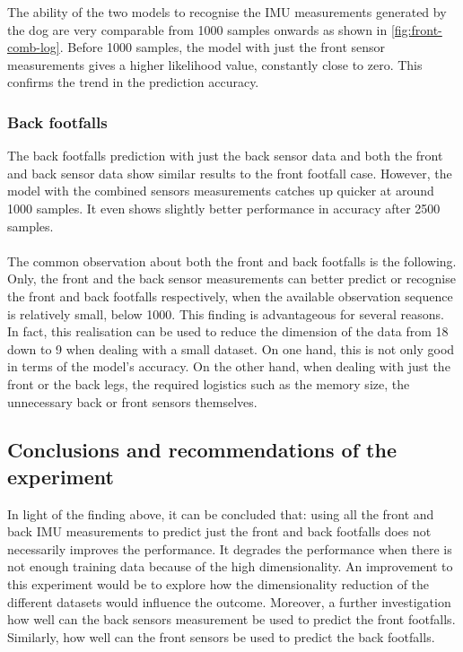 The ability of the two models to recognise the IMU measurements generated by the dog are very comparable from 1000 samples onwards as shown in \ref{fig:front-comb-log}. Before 1000 samples, the model with just the front sensor measurements gives a higher likelihood value, constantly close to zero. This confirms the trend in the prediction accuracy.

\subsubsection{Back footfalls}

The back footfalls prediction with just the back sensor data and both the front and back sensor data show similar results to the front footfall case. However, the model with the combined sensors measurements catches up quicker at around 1000 samples. It even shows slightly better performance in accuracy after 2500 samples.\\\\
The common observation about both the front and back footfalls is the following. Only, the front and the back sensor measurements can better predict or recognise the front and back footfalls respectively, when the available observation sequence is relatively small, below 1000.
This finding is advantageous for several reasons. In fact, this realisation can be used to reduce the dimension of the data from 18 down to 9 when dealing with a small dataset. On one hand, this is not only good in terms of the model's accuracy. On the other hand, when dealing with just the front or the back legs, the required logistics such as the memory size, the unnecessary back or front sensors themselves. 

\subsection{Conclusions and recommendations of the experiment}
In light of the finding above, it can be concluded that: using all the front and back IMU measurements to predict just the front and back footfalls does not necessarily improves the performance. It degrades the performance when there is not enough training data because of the high dimensionality.
An improvement to this experiment would be to explore how the dimensionality reduction of the different datasets would influence the outcome. Moreover, a further investigation how well can the back sensors measurement be used to predict the front footfalls. Similarly, how well can the front sensors be used to predict the back footfalls.


